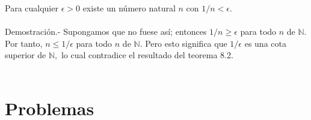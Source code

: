 \begin{teo}
    Para cualquier $\epsilon>0$ existe un número natural $n$ con $1/n<\epsilon$.\\\\
    Demostración.-\; Supongamos que no fuese así; entonces $1/n\geq \epsilon$ para todo $n$ de $\mathbb{N}$. Por tanto, $n\leq 1/\epsilon$ para todo $n$ de $\mathbb{N}.$ Pero esto significa que $1/\epsilon$ es una cota superior de $\mathbb{N},$ lo cual contradice el resultado del teorema 8.2.\\\\
\end{teo}


\section{Problemas}

